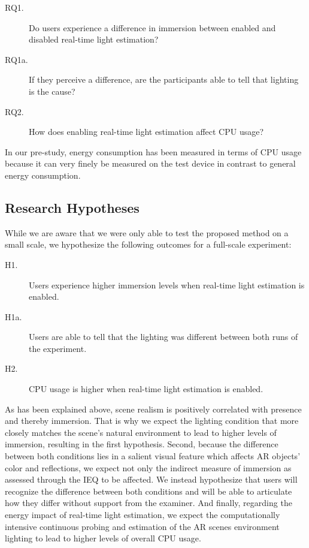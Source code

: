 \documentclass[12pt,twoside,english]{article}
\begin{document}
\begin{description}
    \item[RQ1.] Do users experience a difference in immersion between enabled and disabled real-time light estimation?
    \item[RQ1a.] If they perceive a difference, are the participants able to tell that lighting is the cause?
    \item[RQ2.] How does enabling real-time light estimation affect \gls{CPU} usage?
\end{description}

In our pre-study, energy consumption has been measured in terms of \gls{CPU} usage because it can very finely be measured on the test device in contrast to general energy consumption.

\subsection{Research Hypotheses}

While we are aware that we were only able to test the proposed method on a small scale, we hypothesize the following outcomes for a full-scale experiment:

\begin{description}
    \item[H1.] Users experience higher immersion levels when real-time light estimation is enabled.
    \item[H1a.] Users are able to tell that the lighting was different between both runs of the experiment.
    \item[H2.] \gls{CPU} usage is higher when real-time light estimation is enabled.
\end{description}

As has been explained above, scene realism is positively correlated with presence and thereby immersion.
That is why we expect the lighting condition that more closely matches the scene's natural environment to lead to higher levels of immersion, resulting in the first hypothesis.
Second, because the difference between both conditions lies in a salient visual feature which affects \gls{AR} objects' color and reflections, we expect not only the indirect measure of immersion as assessed through the \gls{IEQ} to be affected.
We instead hypothesize that users will recognize the difference between both conditions and will be able to articulate how they differ without support from the examiner.
And finally, regarding the energy impact of real-time light estimation, we expect the computationally intensive continuous probing and estimation of the \gls{AR} scenes environment lighting to lead to higher levels of overall \gls{CPU} usage.
\end{document}
